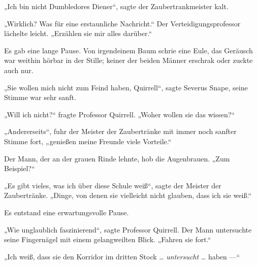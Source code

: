 „Ich bin nicht Dumbledores Diener“, sagte der Zaubertrankmeister kalt.

„Wirklich? Was für eine erstaunliche Nachricht.“ Der Verteidigungsprofessor lächelte leicht.
„Erzählen sie mir alles darüber.“

Es gab eine lange Pause. Von irgendeinem Baum schrie eine Eule, das Geräusch war weithin hörbar in der Stille; keiner der beiden Männer erschrak oder zuckte auch nur.

„Sie wollen mich nicht zum Feind haben, Quirrell“, sagte Severus Snape, seine Stimme war sehr sanft.

„Will ich nicht?“ fragte Professor Quirrell.
„Woher wollen sie das wissen?“

„Andererseits“, fuhr der Meister der Zaubertränke mit immer noch sanfter Stimme fort, „genießen meine Freunde viele Vorteile.“

Der Mann, der an der grauen Rinde lehnte, hob die Augenbrauen.
„Zum Beispiel?“

„Es gibt vieles, was ich über diese Schule weiß“, sagte der Meister der Zaubertränke.
„Dinge, von denen sie vielleicht nicht glauben, dass ich sie weiß.“

Es entstand eine erwartungsvolle Pause.

„Wie unglaublich faszinierend“, sagte Professor Quirrell. Der Mann untersuchte seine Fingernägel mit einem gelangweilten Blick.
„Fahren sie fort.“

„Ich weiß, dass sie den Korridor im dritten Stock … \emph{untersucht} … haben —“

